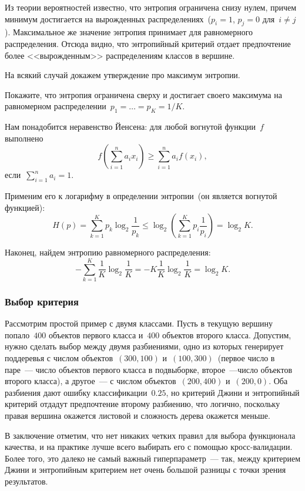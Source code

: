 \documentclass[12pt,fleqn]{article}
\begin{document}
Из теории вероятностей известно, что энтропия ограничена снизу нулем, причем минимум достигается на вырожденных
распределениях~($p_i = 1$, $p_j = 0$ для~$i \neq j$).
Максимальное же значение энтропия принимает для равномерного распределения.
Отсюда видно, что энтропийный критерий отдает предпочтение более <<вырожденным>> распределениям классов
в вершине.

На всякий случай докажем утверждение про максимум энтропии.

\begin{vkProblem}
    Покажите, что энтропия ограничена сверху и достигает своего максимума на
    равномерном распределении~$p_1 = \dots = p_K = 1/K$.
\end{vkProblem}

\begin{esSolution}
    Нам понадобится неравенство Йенсена: для любой вогнутой функции~$f$
    выполнено
    \[
        f\left(\sum_{i = 1}^{n} a_i x_i\right) \geq \sum_{i = 1}^{n} a_i f(x_i),
    \]
    если~$\sum_{i = 1}^{n} a_i = 1$.
    
    Применим его к логарифму в определении энтропии~(он является вогнутой функцией):
    \[
        H(p) = \sum_{k = 1}^{K} p_k \log_2 \frac{1}{p_k}
        \leq
        \log_2 \left( \sum_{k = 1}^{K} p_i \frac{1}{p_i} \right)
        =
        \log_2 K.
    \]
    
    Наконец, найдем энтропию равномерного распределения:
    \[
        -\sum_{k = 1}^{K} \frac{1}{K} \log_2 \frac{1}{K}
        =
        - K \frac{1}{K} \log_2 \frac{1}{K}
        =
        \log_2 K.
    \]        
\end{esSolution}

\subsubsection{Выбор критерия}
Рассмотрим простой пример с двумя классами.
Пусть в текущую вершину попало~$400$ объектов первого класса
и~$400$ объектов второго класса.
Допустим, нужно сделать выбор между двумя разбиениями,
одно из которых генерирует поддеревья с числом объектов~$(300, 100)$ и~$(100, 300)$~(первое
число в паре~--- число объектов первого класса в подвыборке, второе~---число объектов второго
класса),
а другое~--- с числом объектов~$(200, 400)$ и~$(200, 0)$.
Оба разбиения дают ошибку классификации~$0.25$,
но критерий Джини и энтропийный критерий отдадут предпочтение
второму разбиению, что логично,
поскольку правая вершина окажется листовой и сложность дерева
окажется меньше.

В заключение отметим, что нет никаких четких правил для выбора функционала качества,
и на практике лучше всего выбирать его с помощью кросс-валидации.
Более того, это далеко не самый важный гиперпараметр~---
так, между критерием Джини и энтропийным критерием нет очень большой разницы
с точки зрения результатов.
\end{document}
